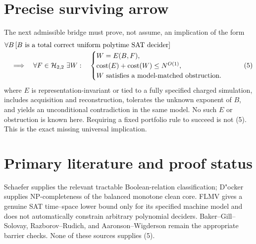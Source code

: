 \documentclass[11pt]{article}
\newcommand{\Htwo}{\mathcal H_{2,2}}
\begin{document}
\section{Precise surviving arrow}

The next admissible bridge must prove, not assume, an implication of the form
\begin{align}
 &\forall B\,[B\text{ is a total correct uniform polytime SAT decider}]
 \notag\\[-2pt]
 &\quad\Longrightarrow\quad
 \forall F\in\Htwo\ \exists W:\quad
 \begin{cases}
 W=E(B,F),\\
 \operatorname{cost}(E)+\operatorname{cost}(W)\le N^{O(1)},\\
 W\text{ satisfies a model-matched obstruction}.
 \end{cases}                                                \tag{5}
\end{align}
where $E$ is representation-invariant or tied to a fully specified charged
simulation, includes acquisition and reconstruction, tolerates the unknown
exponent of $B$, and yields an unconditional contradiction in the same model.
No such $E$ or obstruction is known here.  Requiring a fixed portfolio rule
to succeed is not (5).  This is the exact missing universal implication.

\section{Primary literature and proof status}

Schaefer supplies the relevant tractable Boolean-relation classification;
D"ocker supplies NP-completeness of the balanced monotone clean core.  FLMV
gives a genuine SAT time--space lower bound only for its specified machine
model and does not automatically constrain arbitrary polynomial deciders.
Baker--Gill--Solovay, Razborov--Rudich, and Aaronson--Wigderson remain the
appropriate barrier checks.  None of these sources supplies (5).
\end{document}
